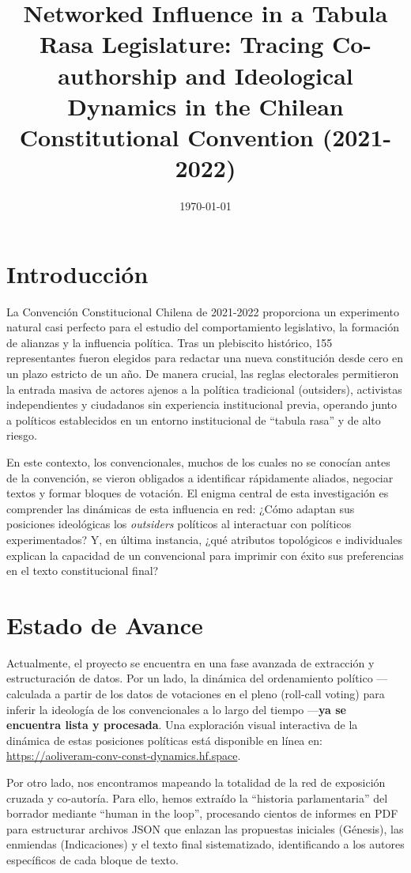 \documentclass[11pt,a4paper]{article}
\title{\textbf{Networked Influence in a Tabula Rasa Legislature: Tracing Co-authorship and Ideological Dynamics in the Chilean Constitutional Convention (2021-2022)}}
\author{}
\date{\today}
\begin{document}
\maketitle

\section{Introducción}

La Convención Constitucional Chilena de 2021-2022 proporciona un experimento natural casi perfecto para el estudio del comportamiento legislativo, la formación de alianzas y la influencia política. Tras un plebiscito histórico, 155 representantes fueron elegidos para redactar una nueva constitución desde cero en un plazo estricto de un año. De manera crucial, las reglas electorales permitieron la entrada masiva de actores ajenos a la política tradicional (outsiders), activistas independientes y ciudadanos sin experiencia institucional previa, operando junto a políticos establecidos en un entorno institucional de ``tabula rasa'' y de alto riesgo.

En este contexto, los convencionales, muchos de los cuales no se conocían antes de la convención, se vieron obligados a identificar rápidamente aliados, negociar textos y formar bloques de votación. El enigma central de esta investigación es comprender las dinámicas de esta influencia en red: ¿Cómo adaptan sus posiciones ideológicas los \textit{outsiders} políticos al interactuar con políticos experimentados? Y, en última instancia, ¿qué atributos topológicos e individuales explican la capacidad de un convencional para imprimir con éxito sus preferencias en el texto constitucional final?

\section{Estado de Avance}

Actualmente, el proyecto se encuentra en una fase avanzada de extracción y estructuración de datos. Por un lado, la dinámica del ordenamiento político ---calculada a partir de los datos de votaciones en el pleno (roll-call voting) para inferir la ideología de los convencionales a lo largo del tiempo ---\textbf{ya se encuentra lista y procesada}. Una exploración visual interactiva de la dinámica de estas posiciones políticas está disponible en línea en: \url{https://aoliveram-conv-const-dynamics.hf.space}.

Por otro lado, nos encontramos mapeando la totalidad de la red de exposición cruzada y co-autoría. Para ello, hemos extraído la ``historia parlamentaria'' del borrador mediante ``human in the loop'', procesando cientos de informes en PDF para estructurar archivos JSON que enlazan las propuestas iniciales (Génesis), las enmiendas (Indicaciones) y el texto final sistematizado, identificando a los autores específicos de cada bloque de texto.
\end{document}
